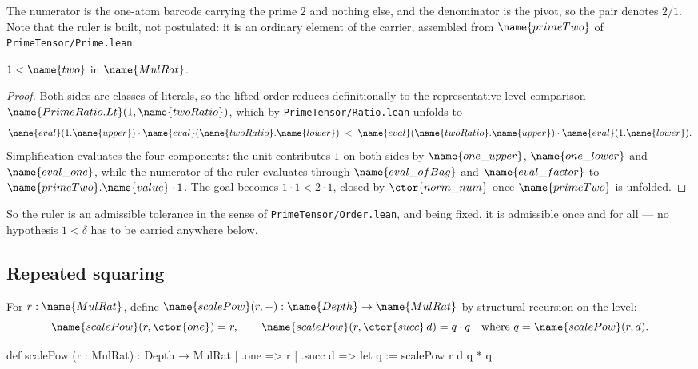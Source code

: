 The numerator is the one-atom barcode carrying the prime $2$ and nothing else,
and the denominator is the pivot, so the pair denotes $2/1$.  Note that the
ruler is built, not postulated: it is an ordinary element of the carrier,
assembled from $\name{primeTwo}$ of \texttt{PrimeTensor/Prime.lean}.

\begin{lemma}\label{Scale:lem:one-lt-two}
$1 < \name{two}$ in $\name{MulRat}$.
\end{lemma}

\begin{proof}
Both sides are classes of literals, so the lifted order reduces definitionally
to the representative-level comparison
$\name{PrimeRatio.Lt}(1, \name{twoRatio})$, which by
\texttt{PrimeTensor/Ratio.lean} unfolds to
\[
  \name{eval}(1.\name{upper}) \cdot \name{eval}(\name{twoRatio}.\name{lower})
    \;<\;
  \name{eval}(\name{twoRatio}.\name{upper}) \cdot
    \name{eval}(1.\name{lower}).
\]
Simplification evaluates the four components: the unit contributes $1$ on both
sides by $\name{one\_upper}$, $\name{one\_lower}$ and
$\name{eval\_one}$, while the numerator of the ruler evaluates through
$\name{eval\_ofBag}$ and $\name{eval\_factor}$ to
$\name{primeTwo}.\name{value} \cdot 1$.  The goal becomes $1 \cdot 1 < 2 \cdot 1$,
closed by $\ctor{norm\_num}$ once $\name{primeTwo}$ is unfolded.
\end{proof}

So the ruler is an admissible tolerance in the sense of
\texttt{PrimeTensor/Order.lean}, and being fixed, it is admissible once and for
all --- no hypothesis $1 < \delta$ has to be carried anywhere below.

\subsection{Repeated squaring}

\begin{definition}\label{Scale:def:scalepow}
For $r : \name{MulRat}$, define $\name{scalePow}(r, -) : \name{Depth} \to
\name{MulRat}$ by structural recursion on the level:
\[
  \name{scalePow}(r, \ctor{one}) = r,
  \qquad
  \name{scalePow}(r, \ctor{succ}\,d) = q \cdot q
    \quad\text{where } q = \name{scalePow}(r, d).
\]
\end{definition}

\begin{leancode}
def scalePow (r : MulRat) : Depth → MulRat
  | .one => r
  | .succ d =>
      let q := scalePow r d
      q * q
\end{leancode}

